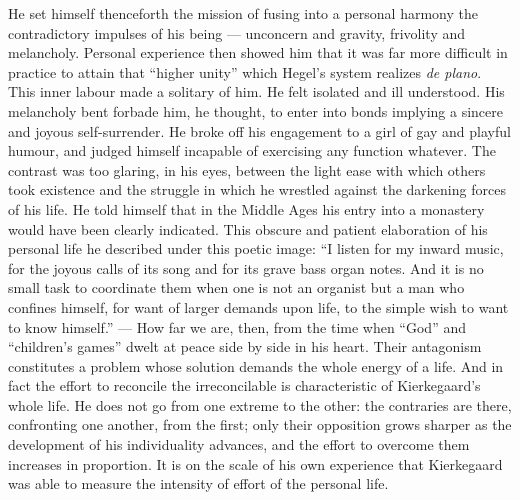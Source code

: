\documentclass[12pt,a4paper]{article}
\newcommand{\opage}[1]{\marginnote{\footnotesize\textit{[#1]}}}
\begin{document}
He set himself thenceforth the mission of fusing into a personal harmony the
contradictory impulses of his being --- unconcern and gravity, frivolity and
melancholy. Personal experience then showed him that it was far more difficult
in practice to attain that ``higher unity'' which Hegel's system realizes
\textit{de plano}. This inner labour made a solitary of him. He felt isolated
and ill understood. His melancholy bent forbade him, he thought, to enter into
bonds implying a sincere and joyous self-surrender. He broke off his engagement
to a girl of gay and playful humour, and judged himself incapable of exercising
any function whatever. The contrast was too glaring, in his eyes, between the
light ease with which others took existence and the struggle in which he
wrestled against the darkening forces of his life. He told himself that in the
Middle Ages his entry into a monastery would have been clearly indicated. This
obscure and patient elaboration of his personal life he described under this
poetic image: ``I listen for my inward music, for the joyous calls of its song
and for its grave bass organ notes. And it is no small task to coordinate them
when one is not an organist but a man who confines himself, for want of \opage{228}larger
demands upon life, to the simple wish to want to know himself.'' --- How far we
are, then, from the time when ``God'' and ``children's games'' dwelt at peace
side by side in his heart. Their antagonism constitutes a problem whose
solution demands the whole energy of a life. And in fact the effort to
reconcile the irreconcilable is characteristic of Kierkegaard's whole life. He
does not go from one extreme to the other: the contraries are there, confronting
one another, from the first; only their opposition grows sharper as the
development of his individuality advances, and the effort to overcome them
increases in proportion. It is on the scale of his own experience that
Kierkegaard was able to measure the intensity of effort of the personal life.
\end{document}
